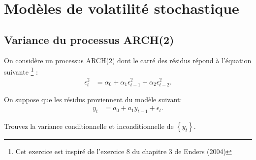\documentclass[11pt,english,francais]{article}
\begin{document}


\addtocounter{section}{2}

\section{Modèles de volatilité stochastique}
\label{sec:serie-dexercices-3}

\subsection{Variance du processus ARCH(2)}
\label{sec:exercice-3-1}

On considère un processus ARCH(2) dont le carré des résidus répond à l'équation suivante \footnote{Cet exercice est inspiré de l'exercice 8 du chapitre 3 de Enders (2004)} :
\begin{align*}
\epsilon_t^2 &= \alpha_0 + \alpha_1\epsilon_{t-1}^2 + \alpha_2\epsilon_{t-2}^2.
\end{align*}

On suppose que les résidus proviennent du modèle suivant:
\begin{align*}
y_t &= a_0 + a_1 y_{t-1} + \epsilon_t.
\end{align*}

Trouvez la variance conditionnelle et inconditionnelle de $\left\{ y_t \right\}$.

\clearpage


\end{document}
